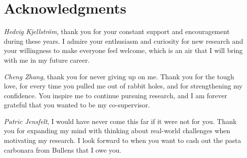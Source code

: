 
\chapter{Acknowledgments}
\label{chap:acknowledgements}

\noindent \textit{Hedvig Kjellström}, thank you for your constant support and encouragement during these years. I admire your enthusiasm and curiosity for new research and your willingness to make everyone feel welcome, which is an air that I will bring with me in my future career. 
\newline 

\noindent \textit{Cheng Zhang}, thank you for never giving up on me. Thank you for the tough love, for every time you pulled me out of rabbit holes, and for strengthening my confidence. You inspire me to continue pursuing research, and I am forever grateful that you wanted to be my co-supervisor. 
\newline

\noindent \textit{Patric Jensfelt}, I would have never come this far if it were not for you. Thank you for expanding my mind with thinking about real-world challenges when motivating my research. I look forward to when you want to cash out the pasta carbonara from Bullens that I owe you. 
\newline 

\noindent 

